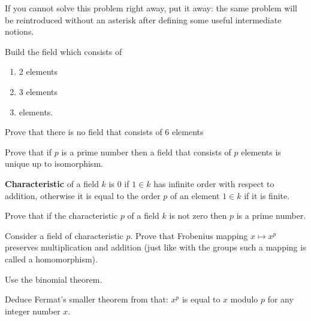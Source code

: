 \documentclass[12pt]{article}
\begin{document}
\begin{zamechanie}
If you cannot solve this problem right away, put it away: the same
problem will be reintroduced without an asterisk after defining some
useful intermediate notions.
\end{zamechanie}

\begin{zadacha}
Build the field which consists of
\begin{enumerate}
\item 2 elements
\item 3 elements
\item{} elements.
\end{enumerate}
\end{zadacha}

\begin{zadacha}[*]
Prove that there is no field that consists of 6 elements
\end{zadacha}

\begin{zadacha}
Prove that if $p$ is a prime number then a field that consists of $p$
elements is unique up to isomorphism.
\end{zadacha}

\begin{opredelenie} {\bf Characteristic} of a field $k$ is $0$ if $1
  \in k$ has infinite order with respect to addition, otherwise it is
  equal to the order $p$ of an element $1 \in k$ if it is finite.
\end{opredelenie}

\begin{zadacha}
Prove that if the characteristic $p$ of a field $k$ is not zero then
$p$ is a prime number.
\end{zadacha} 

\begin{zadacha}[*]
  Consider a field of characteristic $p$. Prove that Frobenius mapping
  $x \mapsto x^p$ preserves multiplication and addition (just like
  with the groups such a mapping is called a homomorphism).
\end{zadacha}

\begin{ukazanie} Use the binomial theorem.
\end{ukazanie}

\begin{zadacha}[*]
Deduce Fermat's smaller theorem from that: $x^p$ is equal to $x$
modulo $p$ for any integer number $x$.
\end{zadacha}
\end{document}
